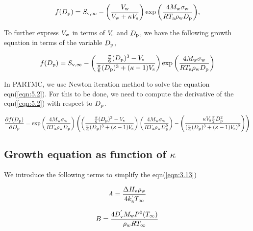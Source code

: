 \documentclass[12pt]{article}
\begin{document}
\begin{equation}\label{eqn:5.1}
f(D_{\rm p})=S_{\rm v, \infty}-\left(\frac{V_{\rm w}}{V_{\rm w} + \kappa V_{\rm s}}\right)\exp{\left(\frac{4 M_{\rm w} \sigma_{\rm w}}{R T_{\rm a} \rho_{\rm w} D_{\rm p}}\right)},
\end{equation}

To further express $V_{\rm w}$ in terms of $V_{\rm s}$ and $ D_{\rm p}$, we have the following growth equation in terms of the variable $D_{\rm p}$,

\begin{equation}\label{eqn:5.2}
f(D_{\rm p})=S_{\rm v, \infty}-\left(\frac{\frac{\pi}{6}(D_{\rm p})^{3}-V_{\rm s}} {\frac{\pi}{6}(D_{\rm p})^{3}+(\kappa-1)V_{\rm s}}\right)
\exp{\left(\frac{4 M_{\rm w} \sigma_{\rm w}}{R T_{\rm a} \rho_{\rm w} D_{\rm p}}\right)}
\end{equation}

In PARTMC, we use Newton iteration method to solve the equation eqn(\ref{eqn:5.2}). For this to be done, we need to compute the derivative of the eqn(\ref{eqn:5.2}) with respect to $D_{\rm p}$.

\begin{equation}\label{eqn:5.2a}
\frac{\partial{f(D_{\rm p})}}     {\partial{D_{\rm p} } } = 
\exp{\left(\frac{4 M_{\rm w} \sigma_{\rm w}}{R T_{\rm a} \rho_{\rm w} D_{\rm p}}\right)} 
\left( \left(\frac{\frac{\pi} {6}(D_{\rm p})^{3}-V_{\rm s}} {\frac{\pi}{6}(D_{\rm p})^{3}+(\kappa-1)V_{\rm s}}\right)
\left(\frac{4 M_{\rm w} \sigma_{\rm w} } { R T_{\rm a} \rho_{\rm w} D_{\rm p}^{2} } \right) - 
\left(\frac{ \kappa V_{\rm s} \frac{\pi}{2}D_{\rm p}^{2} } {(\frac{\pi}{6}(D_{\rm p})^{3}+(\kappa-1)V_{\rm s} )^{2}} \right) 
\right)
\end{equation}  

\subsection{Growth equation as function of $\kappa$}

We introduce the following terms to simplify the eqn(\ref{eqn:3.13})

\begin{equation}\label{eqn:5.3}
A=\frac{\Delta H_{\rm v} \rho_{\rm w}}{4 k_{\rm a}^{'} T_{\infty}}
\end{equation}

\begin{equation}\label{eqn:5.4}
B=\frac{4 D_{\rm v}^{'} M_{\rm w} P^{\rm 0}(T_{\infty})}{\rho_w R T_{\infty}}
\end{equation}
\end{document}
